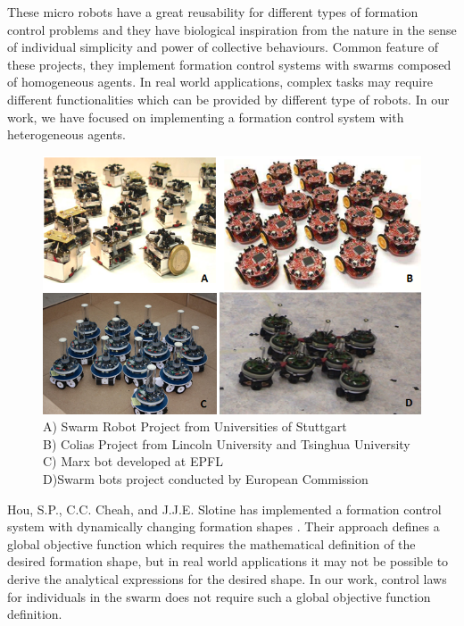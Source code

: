 These micro robots have a great reusability for different types of formation control problems  and they have biological inspiration from the nature in the sense of individual simplicity and power of collective behaviours. Common feature of these projects, they implement formation control systems with swarms composed of homogeneous agents. In real world applications, complex tasks may require different functionalities which can be provided by different type of robots. In our work, we have focused on implementing a formation control system with heterogeneous agents.

\begin{figure}[H]
\captionsetup{format=hang,justification=centerfirst}
\caption{
A) Swarm Robot Project from Universities of Stuttgart \cite{97}  \\
B) Colias Project from Lincoln University and Tsinghua University\cite{96}\\
C) Marx bot developed at EPFL\cite{95} \\
D)Swarm bots project conducted by  European Commission \cite{94}}

\centering
\includegraphics[scale = 0.7]{mobilerobots}
\end{figure}

    
    
  
    
Hou, S.P., C.C. Cheah, and J.J.E. Slotine has implemented a formation control system with dynamically changing formation shapes \cite{8}. Their approach defines a global objective function which requires the mathematical definition of the desired formation shape, but in real world applications it may not be possible to derive the analytical expressions for the desired shape. In our work, control laws for individuals in the swarm does not require such a global objective function definition.

